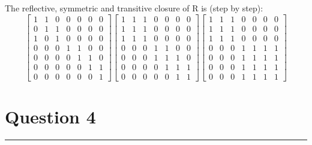\documentclass{article}
\begin{document}
The reflective, symmetric and transitive closure of R is (step by step):
\[
    \begin{bmatrix}
        1 & 1 & 0 & 0 & 0 & 0 & 0 \\
        0 & 1 & 1 & 0 & 0 & 0 & 0 \\
        1 & 0 & 1 & 0 & 0 & 0 & 0 \\
        0 & 0 & 0 & 1 & 1 & 0 & 0 \\
        0 & 0 & 0 & 0 & 1 & 1 & 0 \\
        0 & 0 & 0 & 0 & 0 & 1 & 1 \\
        0 & 0 & 0 & 0 & 0 & 0 & 1
    \end{bmatrix}
    \begin{bmatrix}
        1 & 1 & 1 & 0 & 0 & 0 & 0 \\
        1 & 1 & 1 & 0 & 0 & 0 & 0 \\
        1 & 1 & 1 & 0 & 0 & 0 & 0 \\
        0 & 0 & 0 & 1 & 1 & 0 & 0 \\
        0 & 0 & 0 & 1 & 1 & 1 & 0 \\
        0 & 0 & 0 & 0 & 1 & 1 & 1 \\
        0 & 0 & 0 & 0 & 0 & 1 & 1
    \end{bmatrix}
    \begin{bmatrix}
        1 & 1 & 1 & 0 & 0 & 0 & 0 \\
        1 & 1 & 1 & 0 & 0 & 0 & 0 \\
        1 & 1 & 1 & 0 & 0 & 0 & 0 \\
        0 & 0 & 0 & 1 & 1 & 1 & 1 \\
        0 & 0 & 0 & 1 & 1 & 1 & 1 \\
        0 & 0 & 0 & 1 & 1 & 1 & 1 \\
        0 & 0 & 0 & 1 & 1 & 1 & 1
    \end{bmatrix}
\]

\section*{Question 4}
\hrule
\vspace{0.5cm}
\end{document}
